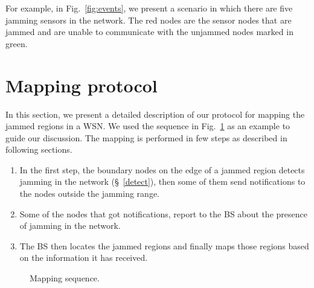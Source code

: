 \documentclass[conference]{IEEEtran}
\begin{document}
For example, in Fig.~\ref{fig:events}, we present a scenario in which there are five jamming sensors in the network. The red nodes are the sensor nodes that are jammed and are unable to communicate with the unjammed nodes marked in green.


\section{Mapping protocol}
\label{mapprot}

In this section, we present a detailed description of our protocol for
mapping the jammed regions in a WSN. We used the sequence in
Fig.~\ref{fig:seq} as an example to guide our discussion. The mapping is
performed in few steps as described in following sections.

\begin{enumerate}\item In the first step, the boundary nodes on the edge of a jammed
  region detects jamming in the network (\S~\ref{detect}), then
  some of them send notifications to the nodes outside the jamming
  range.

\item Some of the nodes that got notifications, report to the BS about
  the presence of jamming in the network.

\item The BS then locates the jammed regions and finally maps those
  regions based on the information it has received.
\end{enumerate}

\begin{figure}
  \begin{center}
    \hspace{.1in}    
  \end{center}
   \begin{center}
    \hspace{.1in}    
  \end{center}
  \begin{center}
    \hspace{.1in}    
  \end{center}
  \caption{Mapping sequence.}
  \label{fig:seq}
\end{figure}
\end{document}
